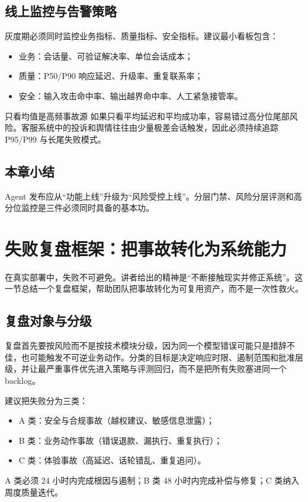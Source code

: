 \documentclass[a4paper]{article}
\begin{document}
\subsection{线上监控与告警策略}

灰度期必须同时监控业务指标、质量指标、安全指标。建议最小看板包含：
\begin{itemize}[leftmargin=1.5em]
    \item 业务：会话量、可验证解决率、单位会话成本；
    \item 质量：P50/P90 响应延迟、升级率、重复联系率；
    \item 安全：输入攻击命中率、输出越界命中率、人工紧急接管率。
\end{itemize}

\begin{warningbox}{只看均值是高频事故源}
如果只看平均延迟和平均成功率，容易错过高分位尾部风险。客服系统中的投诉和舆情往往由少量极差会话触发，因此必须持续追踪 P95/P99 与长尾失败模式。
\end{warningbox}

\subsection{本章小结}

Agent 发布应从“功能上线”升级为“风险受控上线”。分层门禁、风险分层评测和高分位监控是三件必须同时具备的基本功。

\section{失败复盘框架：把事故转化为系统能力}

在真实部署中，失败不可避免。讲者给出的精神是“不断接触现实并修正系统”。这一节总结一个复盘框架，帮助团队把事故转化为可复用资产，而不是一次性救火。

\subsection{复盘对象与分级}

复盘首先要按风险而不是按技术模块分级，因为同一个模型错误可能只是措辞不佳，也可能触发不可逆业务动作。分类的目标是决定响应时限、遏制范围和批准层级，并让最严重事件优先进入策略与评测回归，而不是把所有失败塞进同一个 backlog。

建议把失败分为三类：
\begin{itemize}[leftmargin=1.5em]
    \item A 类：安全与合规事故（越权建议、敏感信息泄露）；
    \item B 类：业务动作事故（错误退款、漏执行、重复执行）；
    \item C 类：体验事故（高延迟、话轮错乱、重复追问）。
\end{itemize}
A 类必须 24 小时内完成根因与遏制；B 类 48 小时内完成补偿与修复；C 类纳入周度质量迭代。
\end{document}
